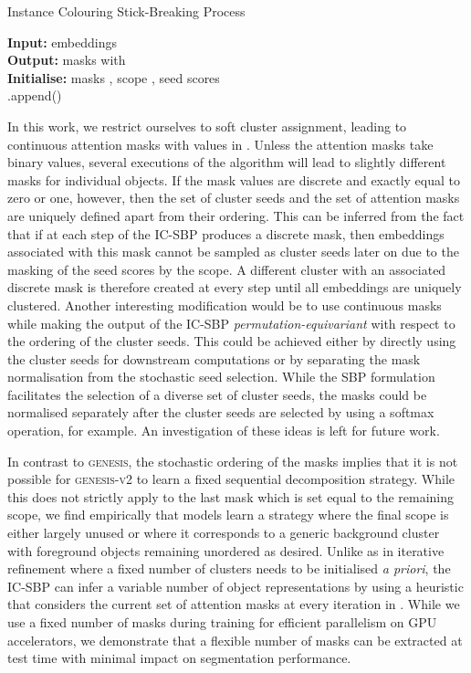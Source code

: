 \documentclass{article}
\begin{document}
\begin{algorithm}
	\caption{Instance Colouring Stick-Breaking Process}
	\label{alg:gpp:ic-sbp}
	\SetAlgoLined
	\textbf{Input:} embeddings \\
	\textbf{Output:} masks  with \\
	\textbf{Initialise:} masks , scope , seed scores \\
	\BlankLine
	.append()
\end{algorithm}

In this work, we restrict ourselves to soft cluster assignment, leading to continuous attention masks with values in .
Unless the attention masks take binary values, several executions of the algorithm will lead to slightly different masks for individual objects.
If the mask values are discrete and exactly equal to zero or one, however, then the set of cluster seeds and the set of attention masks are uniquely defined apart from their ordering.
This can be inferred from the fact that if at each step of the IC-SBP produces a discrete mask, then embeddings associated with this mask cannot be sampled as cluster seeds later on due to the masking of the seed scores by the scope.
A different cluster with an associated discrete mask is therefore created at every step until all embeddings are uniquely clustered.
Another interesting modification would be to use continuous masks while making the output of the IC-SBP \emph{permutation-equivariant} with respect to the ordering of the cluster seeds.
This could be achieved either by directly using the cluster seeds for downstream computations or by separating the mask normalisation from the stochastic seed selection.
While the SBP formulation facilitates the selection of a diverse set of cluster seeds, the masks could be normalised separately after the cluster seeds are selected by using a softmax operation, for example.
An investigation of these ideas is left for future work.

In contrast to \textsc{genesis}, the stochastic ordering of the masks implies that it is not possible for \textsc{genesis-v2} to learn a fixed sequential decomposition strategy.
While this does not strictly apply to the last mask which is set equal to the remaining scope, we find empirically that models learn a strategy where the final scope is either largely unused or where it corresponds to a generic background cluster with foreground objects remaining unordered as desired.
Unlike as in iterative refinement where a fixed number of clusters needs to be initialised \emph{a priori}, the IC-SBP can infer a variable number of object representations by using a heuristic that considers the current set of attention masks at every iteration in .
While we use a fixed number of  masks during training for efficient parallelism on GPU accelerators, we demonstrate that a flexible number of masks can be extracted at test time with minimal impact on segmentation performance.
\end{document}

